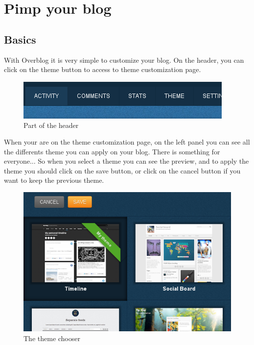 \documentclass[a4paper,10pt]{article}
\begin{document}
\newpage

\section{Pimp your blog}
\subsection{Basics}
With Overblog it is very simple to customize your blog. On the header, you can click on the theme button to access to theme customization page.
\begin{figure}[htpb]
 \centering
 \includegraphics[scale=0.43]{Images/HeaderBar.png}
 \caption{Part of the header}
 \label{customHeader}
\end{figure}

When your are on the theme customization page, on the left panel you can see all the differents theme you can apply on your blog. There is something for
everyone... So when you select a theme you can see the preview, and to apply the theme you should click on the save button, or click on the cancel button if
you want to keep the previous theme.
\begin{figure}[htpb]
 \centering
 \includegraphics[scale=0.43]{Images/ChooseYourTheme.png}
 \caption{The theme chooser}
 \label{customHeader}
\end{figure}
\end{document}
